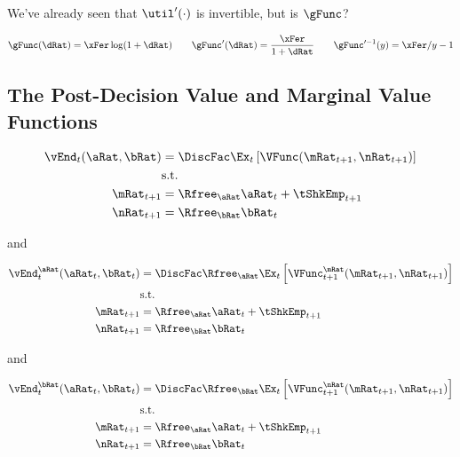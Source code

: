 \documentclass[\econtexRoot/SequentialEGM]{subfiles}
\begin{document}
We've already seen that $\util'(\cdot)$ is invertible, but is $\gFunc$?

\begin{equation}
        \gFunc(\dRat) = \xFer \log(1+\dRat) \qquad \gFunc'(\dRat) =
        \frac{\xFer}{1+\dRat} \qquad \gFunc'^{-1}(y) = \xFer/y - 1
\end{equation}

\subsection{The Post-Decision Value and Marginal Value Functions}

\begin{equation}
        \begin{split}
                \vEnd_{t}(\aRat, \bRat) & =  \DiscFac \Ex_{t} \left[
                        \VFunc(\mRat_{t+1}, \nRat_{t+1}) \right] \\
                & \text{s.t.} \\
                \mRat_{t+1} & = \Rfree_{\aRat} \aRat_{t} + \tShkEmp_{t+1} \\
                \nRat_{t+1} & = \Rfree_{\bRat} \bRat_{t}
        \end{split}
\end{equation}

and

\begin{equation}
        \begin{split}
                \vEnd_{t}^{\aRat}(\aRat_{t}, \bRat_{t}) & =  \DiscFac
                \Rfree_{\aRat} \Ex_{t} \left[ \VFunc^{\mRat}_{t+1}(\mRat_{t+1},
                        \nRat_{t+1})
                        \right] \\
                & \text{s.t.} \\
                \mRat_{t+1} & = \Rfree_{\aRat} \aRat_{t} + \tShkEmp_{t+1} \\
                \nRat_{t+1} & = \Rfree_{\bRat} \bRat_{t}
        \end{split}
\end{equation}

and

\begin{equation}
        \begin{split}
                \vEnd_{t}^{\bRat}(\aRat_{t}, \bRat_{t}) & =  \DiscFac
                \Rfree_{\bRat} \Ex_{t} \left[ \VFunc^{\nRat}_{t+1}(\mRat_{t+1},
                        \nRat_{t+1})
                        \right] \\
                & \text{s.t.} \\
                \mRat_{t+1} & = \Rfree_{\aRat} \aRat_{t} + \tShkEmp_{t+1} \\
                \nRat_{t+1} & = \Rfree_{\bRat} \bRat_{t}
        \end{split}
\end{equation}
\end{document}
